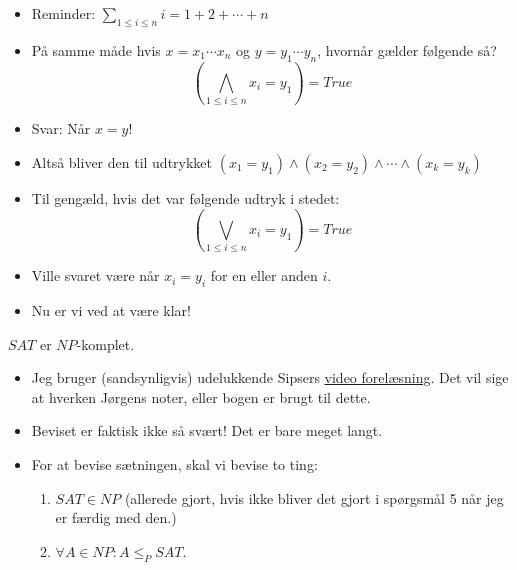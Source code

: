 \begin{frame}[allowframebreaks]
	\begin{itemize}
		\item Reminder: \(\sum_{1 \le i \le n}i = 1 + 2+ \cdots + n\)
		\item På samme måde hvis $x = x_{1} \cdots x_{n}$ og $y = y_{1} \cdots y_{n}$, hvornår gælder følgende så?
		      \begin{equation}
			      \left( \bigwedge_{1 \le i \le n} x_{i} = y_{1} \right) = True
		      \end{equation}
		\item Svar: Når $x = y$!
		\item Altså bliver den til udtrykket $(x_{1} = y_1) \land (x_{2} = y_2) \land \cdots \land (x_{k} = y_{k})$
		\item Til gengæld, hvis det var følgende udtryk i stedet:
		      \begin{equation}
			      \left( \bigvee_{1 \le i \le n} x_{i} = y_{1} \right) = True
		      \end{equation}
		\item Ville svaret være når $x_{i} = y_{i}$ for en eller anden $i$.
		\item Nu er vi ved at være klar!
	\end{itemize}

	\begin{theorem}
		$SAT$ er $NP$-komplet.
	\end{theorem}
	\begin{itemize}
		\item Jeg bruger (sandsynligvis) udelukkende Sipsers \href{https://youtu.be/6Az1gtDRaAU}{video forelæsning}. Det vil sige at hverken Jørgens noter, eller bogen er brugt til dette.
		\item Beviset er faktisk ikke så svært! Det er bare meget langt.
		\item For at bevise sætningen, skal vi bevise to ting:
		      \begin{enumerate}
			      \item $SAT \in NP$ (allerede gjort, hvis ikke bliver det gjort i spørgsmål 5 når jeg er færdig med den.)
			      \item $\forall A \in NP : A \le_{P} SAT$.
		      \end{enumerate}


\end{itemize}
\end{frame}
